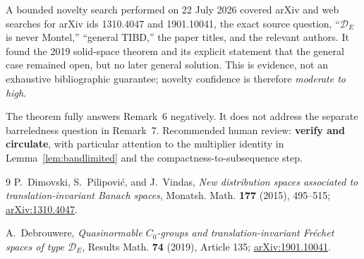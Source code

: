 \documentclass[11pt]{article}
\begin{document}
A bounded novelty search performed on 22 July 2026 covered arXiv and web
searches for arXiv ids 1310.4047 and 1901.10041, the exact source question,
``$\mathcal D_E$ is never Montel,'' ``general TIBD,'' the paper titles, and
the relevant authors.  It found the 2019 solid-space theorem and its explicit
statement that the general case remained open, but no later general solution.
This is evidence, not an exhaustive bibliographic guarantee; novelty
confidence is therefore \emph{moderate to high}.

The theorem fully answers Remark~6 negatively.  It does not address the
separate barreledness question in Remark~7.  Recommended human review:
\textbf{verify and circulate}, with particular attention to the multiplier
identity in Lemma~\ref{lem:bandlimited} and the compactness-to-subsequence
step.

\small
\begin{thebibliography}{9}
\setlength{\itemsep}{2pt}
P.~Dimovski, S.~Pilipovi\'c, and J.~Vindas,
\emph{New distribution spaces associated to translation-invariant Banach
spaces}, Monatsh. Math. \textbf{177} (2015), 495--515;
\href{https://arxiv.org/abs/1310.4047}{arXiv:1310.4047}.

A.~Debrouwere,
\emph{Quasinormable $C_0$-groups and translation-invariant Fr\'echet spaces
of type $\mathcal D_E$}, Results Math. \textbf{74} (2019), Article 135;
\href{https://arxiv.org/abs/1901.10041}{arXiv:1901.10041}.
\end{thebibliography}
\end{document}
